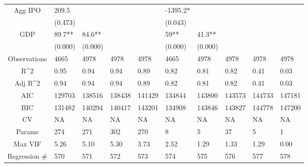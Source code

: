 \documentclass{article}
\begin{document}
\begin{table}[H]
\begin{tabular}{|clllllllll|}
  Agg IPO & 209.5 &  &  &  & -1395.2* &  &  &  &  \\ 
   & (0.473) &  &  &  & (0.043) &  &  &  &  \\ 
  GDP & 89.7** & 84.6** &  &  & 59** & 41.3** &  &  &  \\ 
   & (0.000) & (0.000) &  &  & (0.000) & (0.000) &  &  &  \\ 
  \hline 
 Observations & 4665 & 4978 & 4978 & 4978 & 4665 & 4978 & 4978 & 4978 & 4978 \\ 
  R^2 & 0.95 & 0.94 & 0.94 & 0.89 & 0.82 & 0.81 & 0.82 & 0.41 & 0.03 \\ 
  Adj R^2 & 0.94 & 0.94 & 0.94 & 0.89 & 0.82 & 0.81 & 0.82 & 0.41 & 0.03 \\ 
  AIC & 129703 & 138516 & 138438 & 141429 & 134844 & 143800 & 143573 & 144733 & 147181 \\ 
  BIC & 131482 & 140294 & 140417 & 143201 & 134908 & 143846 & 143827 & 144778 & 147200 \\ 
  CV & NA & NA & NA & NA & NA & NA & NA & NA & NA \\ 
  Params & 274 & 271 & 302 & 270 & 8 & 5 & 37 & 5 & 1 \\ 
  Max VIF & 5.26 & 5.10 & 5.30 & 3.73 & 2.52 & 1.29 & 1.33 & 1.29 & 0.00 \\ 
  Regression \# & 570 & 571 & 572 & 573 & 574 & 575 & 576 & 577 & 578 \\ 
   \hline
\end{tabular}
 
\end{table}
\end{document}
